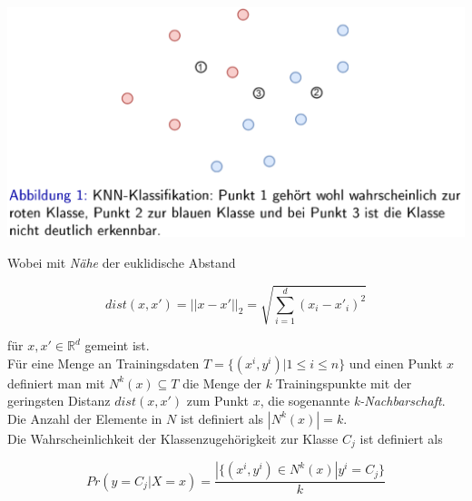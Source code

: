\documentclass{report}
\begin{document}
  \begin{center}	
    \includegraphics[scale=.275]{ml05_1}	
  \end{center}	
  
  Wobei mit \textit{Nähe} der euklidische Abstand	
  
  $$dist(x, x') = ||x - x'||_2 = \sqrt{\sum_{i=1}^d(x_i - x'_i)^2}$$	
  
  für $x, x' \in \mathbb{R}^d$ gemeint ist.\\	
  Für eine Menge an Trainingsdaten $T = \{(x^i, y^i) | 1\leq i \leq n\}$ und einen Punkt $x$	
  definiert man mit $N^k(x)\subseteq T$ die Menge der \textit{k} Trainingspunkte mit der geringsten Distanz $dist(x,x')$ zum Punkt $x$,	
  die sogenannte \textit{k-Nachbarschaft}. Die Anzahl der Elemente in $N$ ist definiert als $|N^k(x)| = k$.\\	
  Die Wahrscheinlichkeit der Klassenzugehörigkeit zur Klasse $C_j$ ist definiert als	
  
  $$Pr(y = C_j | X = x) = \frac{|\{(x^i, y^i) \in N^k(x) | y^i = C_j\}}{k}$$	
  
\end{document}
